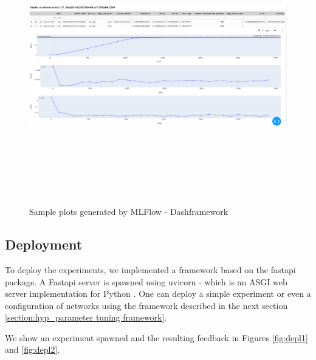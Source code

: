 \begin{figure}[htpb]
\centering
  \includegraphics[width=1\textwidth,height=12cm]{figures/DashBoord-Dash.png}
  \caption[Sample plots -MLFlow Dash]{Sample plots generated by MLFlow - Dashframework} \label{fig:dashboard-dash}
\end{figure}

\pagebreak
\subsection{Deployment}
    To deploy the experiments, we implemented a framework based on the fastapi \cite{FastAPI} package. A Fastapi server is spawned using uvicorn - which is an ASGI web server implementation for Python \cite{UVicorn}. One can deploy a simple experiment or even a configuration of networks using the framework described in the next section \ref{section:hyp_parameter tuning framework}. 

    We show an experiment spawned and the resulting feedback in Figures \ref{fig:depl1} and \ref{fig:depl2}.
    
